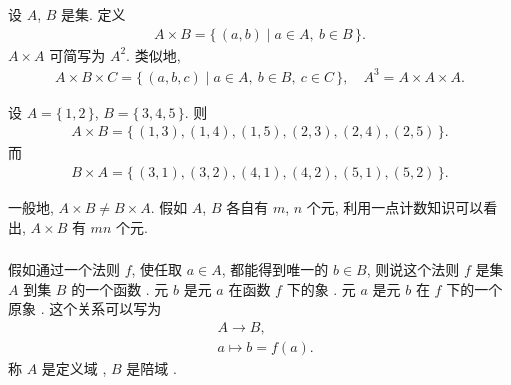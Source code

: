 \begin{definition}
    设 $A$, $B$ 是集. 定义
    \begin{align*}
        A \times B = \{\, (a,b) \mid a \in A, \ b \in B  \,\}.
    \end{align*}
    $A \times A$ 可简写为 $A^2$. 类似地,
    \begin{align*}
        A \times B \times C = \{\, (a,b,c) \mid a \in A, \ b \in B, \ c \in C  \,\}, \quad A^3 = A \times A \times A.
    \end{align*}
\end{definition}

\begin{example}
    设 $A = \{\, 1,2 \,\}$, $B = \{\, 3,4,5 \,\}$. 则
    \begin{align*}
        A \times B = \{\, (1,3),(1,4),(1,5),(2,3),(2,4),(2,5) \,\}.
    \end{align*}
    而
    \begin{align*}
        B \times A = \{\, (3,1),(3,2),(4,1),(4,2),(5,1),(5,2) \,\}.
    \end{align*}
\end{example}

\begin{remark}
    一般地, $A \times B \neq B \times A$. 假如 $A$, $B$ 各自有 $m$, $n$ 个元, 利用一点计数知识可以看出, $A \times B$ 有 $mn$ 个元.
\end{remark}

\subsubsection*{\Functions}

\begin{definition}
    假如通过一个法则 $f$, 使任取 $a \in A$, 都能得到唯一的 $b \in B$, 则说这个法则 $f$ 是集 $A$ 到集 $B$ 的一个函数 . 元 $b$ 是元 $a$ 在函数 $f$ 下的象 . 元 $a$ 是元 $b$ 在 $f$ 下的一个原象 . 这个关系可以写为
    \begin{align*}
         & A \to B,  \tag*{$f$:} \\
         & a \mapsto b = f(a).
    \end{align*}
    称 $A$ 是定义域 , $B$ 是陪域 .
\end{definition}

